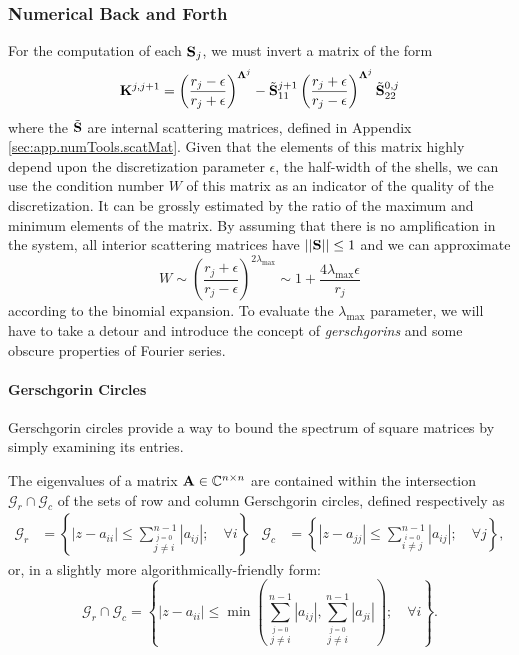 \subsubsection{Numerical Back and Forth}
For the computation of each $\mathbf{S}_j$, we must invert
a matrix of the form 
  \begin{equation}
  \mathbf{K}^{j,j+1} = \left(\frac{r_j-\epsilon}{r_j+\epsilon}\right)^{\boldsymbol{\Lambda}^j}
		    -\tilde{\mathbf{S}}^{j+1}_{11}\left(\frac{r_j+\epsilon}{r_j-\epsilon}\right)^{\boldsymbol{\Lambda}^j}\tilde{\mathbf{S}}^{0,j}_{22}
  \end{equation}
where the $\tilde{\mathbf{S}}$ are internal scattering matrices, 
defined in Appendix \ref{sec:app.numTools.scatMat}.
Given that the elements of this matrix highly depend upon the discretization
parameter $\epsilon$, the half-width of the shells, we can use the
condition number $W$ of this matrix as an indicator of the quality
of the discretization. It can be grossly estimated by the 
ratio of the maximum and minimum elements of the matrix. 
By assuming that there is no amplification in the system,
all interior scattering matrices have
$||\mathbf{S}||\leq1$ and we can approximate
  \begin{equation}
   W \sim \left(\frac{r_j+\epsilon}{r_j-\epsilon}\right)^{2\lambda_\text{max}}\sim 1 + \frac{4\lambda_\text{max}\epsilon}{r_j}
  \end{equation}
according to the binomial expansion.
To evaluate the $\lambda_\text{max}$ parameter, we will
have to take a detour and introduce the concept 
of \textit{\glspl{gerschgorin}} and some obscure
properties of Fourier series.

\paragraph{Gerschgorin Circles}
Gerschgorin circles provide a way to bound the spectrum 
of square matrices by simply examining its entries.

\begin{thm}
 The eigenvalues of a matrix $\mathbf{A}\in\mathbb{C}^{n\times n}$ are
 contained within the intersection $\mathcal{G}_r\cap\mathcal{G}_c$
 of the sets of row and column Gerschgorin circles, defined respectively as
  \begin{align*}
   \mathcal{G}_r	&= \left\{|z-a_{ii}| \leq \sum_{\stackrel{j=0}{j\neq i}}^{n-1} |a_{ij}|; \quad \forall i\right\}
  & \mathcal{G}_c	&= \left\{|z-a_{jj}| \leq \sum_{\stackrel{i=0}{i\neq j}}^{n-1} |a_{ij}|; \quad \forall j\right\},
  \end{align*}
 or, in a slightly more algorithmically-friendly form:
  \begin{equation}
   \mathcal{G}_r\cap\mathcal{G}_c = \left\{|z-a_{ii}| \leq \min\left(\sum_{\stackrel{j=0}{j\neq i}}^{n-1} |a_{ij}|,\sum_{\stackrel{j=0}{j\neq i}}^{n-1} |a_{ji}|\right)
				     ;\quad \forall i\right\}.
  \end{equation}
\end{thm}

